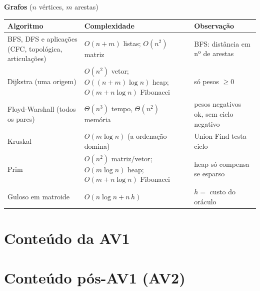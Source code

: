 \documentclass[11pt,a4paper]{article}
\theoremstyle{plain}
\theoremstyle{definition}
\theoremstyle{remark}
\numberwithin{equation}{section}
\begin{document}
\begin{center}
\medskip
\textbf{Grafos} ($n$ vértices, $m$ arestas)\\[2pt]
\begin{tabularx}{\linewidth}{@{}>{\raggedright\arraybackslash}p{4.1cm}>{\raggedright\arraybackslash}X>{\raggedright\arraybackslash}p{4.3cm}@{}}
\toprule
Algoritmo & Complexidade & Observação\\
\midrule
BFS, DFS e aplicações (CFC, topológica, articulações) & $O(n+m)$ listas; $O(n^2)$ matriz & BFS: distância em nº de arestas\\
Dijkstra (uma origem) & $O(n^2)$ vetor; $O((n+m)\log n)$ heap; $O(m+n\log n)$ Fibonacci & só pesos $\ge0$\\
Floyd-Warshall (todos os pares) & $\Theta(n^3)$ tempo, $\Theta(n^2)$ memória & pesos negativos ok, sem ciclo negativo\\
Kruskal & $O(m\log n)$ (a ordenação domina) & Union-Find testa ciclo\\
Prim & $O(n^2)$ matriz/vetor; $O(m\log n)$ heap; $O(m+n\log n)$ Fibonacci & heap só compensa se esparso\\
Guloso em matroide & $O(n\log n+n\,h)$ & $h=$ custo do oráculo\\
\bottomrule
\end{tabularx}
\end{center}

\newpage
\part{Conteúdo da AV1}











\newpage
\part{Conteúdo pós-AV1 (AV2)}





\end{document}
